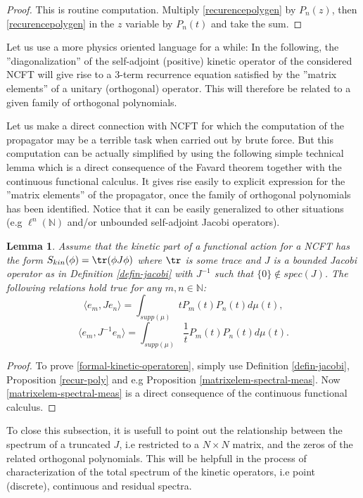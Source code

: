 \documentclass[a4paper]{jpconf}
\numberwithin{equation}{section}
\newtheorem{lemma}[Theorem]{Lemma}
\theoremstyle{nonumberplain}
\newtheorem{proof}{Proof}
\begin{document}
\begin{proof}
This is routine computation. Multiply \eqref{recurencepolygen} by $P_{n}(z)$, then \eqref{recurencepolygen} in the $z$ variable by $P_n(t)$ and take the sum.
\end{proof}
Let us use a more physics oriented language for a while: In the following, the ''diagonalization'' of the self-adjoint (positive) kinetic operator of the considered NCFT will give rise to a 3-term recurrence equation satisfied by the ''matrix elements'' of a unitary (orthogonal) operator. This will therefore be related to a given family of orthogonal polynomials. \par  
Let us make a direct connection with NCFT for which the computation of the propagator may be a terrible task when carried out by brute force. But this computation can be actually simplified by using the following simple technical lemma which is a direct consequence of the Favard theorem together with the continuous functional calculus. It gives rise easily to explicit expression for the ''matrix elements'' of the propagator, once the family of orthogonal polynomials has been identified. Notice that it can be easily generalized to other situations (e.g $\ell^n(\mathbb{N})$ and/or unbounded self-adjoint Jacobi operators).
\begin{lemma}\label{propagator}
Assume that the kinetic part of a functional action for a NCFT has the form $S_{kin}(\phi)=\tr(\phi J\phi)$ where $\tr$ is some trace and $J$ is a bounded Jacobi operator as in Definition \ref{defin-jacobi} with $J^{-1}$ such that $\{0\}\notin spec(J)$. The following relations hold true for any $m,n\in\mathbb{N}$:
\begin{equation}
\langle e_m,J e_n \rangle=\int_{supp(\mu)}tP_m(t)P_n(t)d\mu(t),\label{formal-kinetic-operatoren}
\end{equation}
\begin{equation}
 \langle e_m,J^{-1} e_n\rangle=\int_{supp(\mu)}\frac{1}{t}P_m(t)P_n(t)d\mu(t)\label{formal-propagatoren}.
\end{equation}
\end{lemma}
\begin{proof}
To prove \eqref{formal-kinetic-operatoren}, simply use Definition \ref{defin-jacobi}, Proposition \ref{recur-poly} and e.g Proposition \ref{matrixelem-spectral-meas}. Now \eqref{matrixelem-spectral-meas} is a direct consequence of the continuous functional calculus.
\end{proof}
To close this subsection, it is usefull to point out the relationship between the spectrum of a truncated $J$, i.e restricted to a $N\times N$ matrix, and the zeros of the related orthogonal polynomials. This will be helpfull in the process of characterization of the total spectrum of the kinetic operators, i.e point (discrete), continuous and residual spectra.
\end{document}
